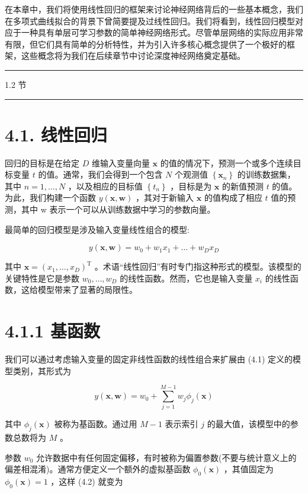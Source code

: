 \documentclass[10pt]{report}
\newcommand{\HRule}{\begin{center}\rule{0.9\linewidth}{0.2mm}\end{center}}
\begin{document}
在本章中，我们将使用线性回归的框架来讨论神经网络背后的一些基本概念，我们在多项式曲线拟合的背景下曾简要提及过线性回归。我们将看到，线性回归模型对应于一种具有单层可学习参数的简单神经网络形式。尽管单层网络的实际应用非常有限，但它们具有简单的分析特性，并为引入许多核心概念提供了一个极好的框架，这些概念将为我们在后续章节中讨论深度神经网络奠定基础。

\HRule

1.2 节

\HRule

\section*{4.1. 线性回归}

回归的目标是在给定 \(D\) 维输入变量向量 \(\mathbf{x}\) 的值的情况下，预测一个或多个连续目标变量 \(t\) 的值。通常，我们会得到一个包含 \(N\) 个观测值 \(\left\{  {\mathbf{x}}_{n}\right\}\) 的训练数据集，其中 \(n = 1,\ldots ,N\) ，以及相应的目标值 \(\left\{  {t}_{n}\right\}\) ，目标是为 \(\mathbf{x}\) 的新值预测 \(t\) 的值。为此，我们构建一个函数 \(y\left( {\mathbf{x},\mathbf{w}}\right)\) ，其对于新输入 \(\mathbf{x}\) 的值构成了相应 \(t\) 值的预测，其中 w 表示一个可以从训练数据中学习的参数向量。

最简单的回归模型是涉及输入变量线性组合的模型:

\[
y\left( {\mathbf{x},\mathbf{w}}\right)  = {w}_{0} + {w}_{1}{x}_{1} + \ldots  + {w}_{D}{x}_{D} \tag{4.1}
\]

其中 \(\mathbf{x} = {\left( {x}_{1},\ldots ,{x}_{D}\right) }^{\mathrm{T}}\) 。术语“线性回归”有时专门指这种形式的模型。该模型的关键特性是它是参数 \({w}_{0},\ldots ,{w}_{D}\) 的线性函数。然而，它也是输入变量 \({x}_{i}\) 的线性函数，这给模型带来了显著的局限性。

\section*{4.1.1 基函数}

我们可以通过考虑输入变量的固定非线性函数的线性组合来扩展由 (4.1) 定义的模型类别，其形式为

\[
y\left( {\mathbf{x},\mathbf{w}}\right)  = {w}_{0} + \mathop{\sum }\limits_{{j = 1}}^{{M - 1}}{w}_{j}{\phi }_{j}\left( \mathbf{x}\right)  \tag{4.2}
\]

其中 \({\phi }_{j}\left( \mathbf{x}\right)\) 被称为基函数。通过用 \(M - 1\) 表示索引 \(j\) 的最大值，该模型中的参数总数将为 \(M\) 。

参数 \({w}_{0}\) 允许数据中有任何固定偏移，有时被称为偏置参数(不要与统计意义上的偏差相混淆)。通常方便定义一个额外的虚拟基函数 \({\phi }_{0}\left( \mathbf{x}\right)\) ，其值固定为 \({\phi }_{0}\left( \mathbf{x}\right)  = 1\) ，这样 (4.2) 就变为
\end{document}
